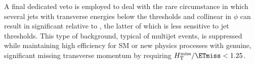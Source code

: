 

A final dedicated veto is employed to deal with the rare circumstance
in which several jets with transverse energies below the \Et
thresholds and collinear in $\phi$ can result in significant \mht
relative to \ETmiss, the latter of which is less sensitive to jet
thresholds. This type of background, typical of multijet events, is
suppressed while maintaining high efficiency for SM or new physics
processes with genuine, significant missing transverse momentum by
requiring $\mht / \ETmiss < 1.25$. 

